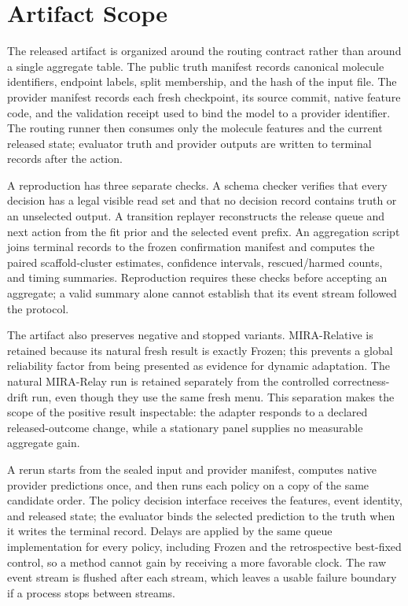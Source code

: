 \documentclass[sigconf,anonymous]{aamas}
\begin{document}
\section{Artifact Scope}
The released artifact is organized around the routing contract rather than around a single aggregate table. The public truth manifest records canonical molecule identifiers, endpoint labels, split membership, and the hash of the input file. The provider manifest records each fresh checkpoint, its source commit, native feature code, and the validation receipt used to bind the model to a provider identifier. The routing runner then consumes only the molecule features and the current released state; evaluator truth and provider outputs are written to terminal records after the action.



A reproduction has three separate checks. A schema checker verifies that every decision has a legal visible read set and that no decision record contains truth or an unselected output. A transition replayer reconstructs the release queue and next action from the fit prior and the selected event prefix. An aggregation script joins terminal records to the frozen confirmation manifest and computes the paired scaffold-cluster estimates, confidence intervals, rescued/harmed counts, and timing summaries. Reproduction requires these checks before accepting an aggregate; a valid summary alone cannot establish that its event stream followed the protocol.

The artifact also preserves negative and stopped variants. MIRA-Relative is retained because its natural fresh result is exactly Frozen; this prevents a global reliability factor from being presented as evidence for dynamic adaptation. The natural MIRA-Relay run is retained separately from the controlled correctness-drift run, even though they use the same fresh menu. This separation makes the scope of the positive result inspectable: the adapter responds to a declared released-outcome change, while a stationary panel supplies no measurable aggregate gain.

A rerun starts from the sealed input and provider manifest, computes native provider predictions once, and then runs each policy on a copy of the same candidate order. The policy decision interface receives the features, event identity, and released state; the evaluator binds the selected prediction to the truth when it writes the terminal record. Delays are applied by the same queue implementation for every policy, including Frozen and the retrospective best-fixed control, so a method cannot gain by receiving a more favorable clock. The raw event stream is flushed after each stream, which leaves a usable failure boundary if a process stops between streams.
\end{document}
